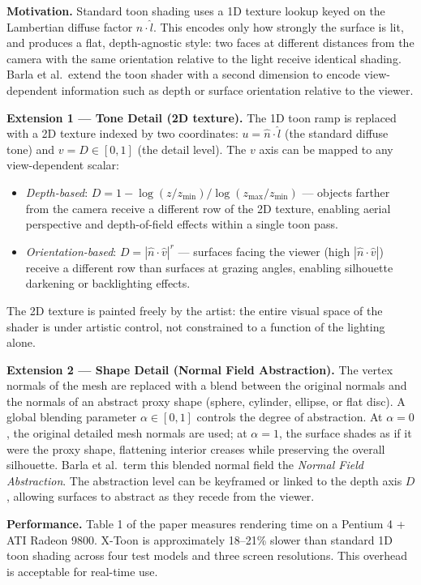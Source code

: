 \documentclass[11pt, a4paper]{article}
\begin{document}
\textbf{Motivation.} Standard toon shading uses a 1D texture lookup keyed on the Lambertian diffuse factor $\hat{n} \cdot \hat{l}$. This encodes only how strongly the surface is lit, and produces a flat, depth-agnostic style: two faces at different distances from the camera with the same orientation relative to the light receive identical shading. Barla et al.\ extend the toon shader with a second dimension to encode view-dependent information such as depth or surface orientation relative to the viewer.

\textbf{Extension 1 --- Tone Detail (2D texture).} The 1D toon ramp is replaced with a 2D texture indexed by two coordinates: $u = \hat{n} \cdot \hat{l}$ (the standard diffuse tone) and $v = D \in [0,1]$ (the detail level). The $v$ axis can be mapped to any view-dependent scalar:
\begin{itemize}[leftmargin=2em]
  \item \textit{Depth-based}: $D = 1 - \log(z / z_{\min}) / \log(z_{\max} / z_{\min})$ --- objects farther from the camera receive a different row of the 2D texture, enabling aerial perspective and depth-of-field effects within a single toon pass.
  \item \textit{Orientation-based}: $D = |\hat{n} \cdot \hat{v}|^r$ --- surfaces facing the viewer (high $|\hat{n} \cdot \hat{v}|$) receive a different row than surfaces at grazing angles, enabling silhouette darkening or backlighting effects.
\end{itemize}
The 2D texture is painted freely by the artist: the entire visual space of the shader is under artistic control, not constrained to a function of the lighting alone.

\textbf{Extension 2 --- Shape Detail (Normal Field Abstraction).} The vertex normals of the mesh are replaced with a blend between the original normals and the normals of an abstract proxy shape (sphere, cylinder, ellipse, or flat disc). A global blending parameter $\alpha \in [0,1]$ controls the degree of abstraction. At $\alpha = 0$, the original detailed mesh normals are used; at $\alpha = 1$, the surface shades as if it were the proxy shape, flattening interior creases while preserving the overall silhouette. Barla et al.\ term this blended normal field the \textit{Normal Field Abstraction}. The abstraction level can be keyframed or linked to the depth axis $D$, allowing surfaces to abstract as they recede from the viewer.

\textbf{Performance.} Table 1 of the paper measures rendering time on a Pentium 4 + ATI Radeon 9800. X-Toon is approximately 18--21\% slower than standard 1D toon shading across four test models and three screen resolutions. This overhead is acceptable for real-time use.
\end{document}
